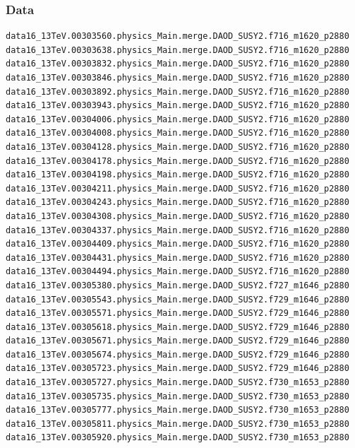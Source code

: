 \documentclass[mathserif,serif]{beamer}
\begin{document}
\begin{frame}[fragile]
\frametitle{Data}
\tiny
\begin{verbatim}
data16_13TeV.00303560.physics_Main.merge.DAOD_SUSY2.f716_m1620_p2880
data16_13TeV.00303638.physics_Main.merge.DAOD_SUSY2.f716_m1620_p2880
data16_13TeV.00303832.physics_Main.merge.DAOD_SUSY2.f716_m1620_p2880
data16_13TeV.00303846.physics_Main.merge.DAOD_SUSY2.f716_m1620_p2880
data16_13TeV.00303892.physics_Main.merge.DAOD_SUSY2.f716_m1620_p2880
data16_13TeV.00303943.physics_Main.merge.DAOD_SUSY2.f716_m1620_p2880
data16_13TeV.00304006.physics_Main.merge.DAOD_SUSY2.f716_m1620_p2880
data16_13TeV.00304008.physics_Main.merge.DAOD_SUSY2.f716_m1620_p2880
data16_13TeV.00304128.physics_Main.merge.DAOD_SUSY2.f716_m1620_p2880
data16_13TeV.00304178.physics_Main.merge.DAOD_SUSY2.f716_m1620_p2880
data16_13TeV.00304198.physics_Main.merge.DAOD_SUSY2.f716_m1620_p2880
data16_13TeV.00304211.physics_Main.merge.DAOD_SUSY2.f716_m1620_p2880
data16_13TeV.00304243.physics_Main.merge.DAOD_SUSY2.f716_m1620_p2880
data16_13TeV.00304308.physics_Main.merge.DAOD_SUSY2.f716_m1620_p2880
data16_13TeV.00304337.physics_Main.merge.DAOD_SUSY2.f716_m1620_p2880
data16_13TeV.00304409.physics_Main.merge.DAOD_SUSY2.f716_m1620_p2880
data16_13TeV.00304431.physics_Main.merge.DAOD_SUSY2.f716_m1620_p2880
data16_13TeV.00304494.physics_Main.merge.DAOD_SUSY2.f716_m1620_p2880
data16_13TeV.00305380.physics_Main.merge.DAOD_SUSY2.f727_m1646_p2880
data16_13TeV.00305543.physics_Main.merge.DAOD_SUSY2.f729_m1646_p2880
data16_13TeV.00305571.physics_Main.merge.DAOD_SUSY2.f729_m1646_p2880
data16_13TeV.00305618.physics_Main.merge.DAOD_SUSY2.f729_m1646_p2880
data16_13TeV.00305671.physics_Main.merge.DAOD_SUSY2.f729_m1646_p2880
data16_13TeV.00305674.physics_Main.merge.DAOD_SUSY2.f729_m1646_p2880
data16_13TeV.00305723.physics_Main.merge.DAOD_SUSY2.f729_m1646_p2880
data16_13TeV.00305727.physics_Main.merge.DAOD_SUSY2.f730_m1653_p2880
data16_13TeV.00305735.physics_Main.merge.DAOD_SUSY2.f730_m1653_p2880
data16_13TeV.00305777.physics_Main.merge.DAOD_SUSY2.f730_m1653_p2880
data16_13TeV.00305811.physics_Main.merge.DAOD_SUSY2.f730_m1653_p2880
data16_13TeV.00305920.physics_Main.merge.DAOD_SUSY2.f730_m1653_p2880
\end{verbatim}
\end{frame}
\end{document}
